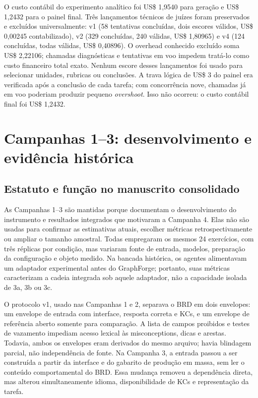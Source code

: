 \documentclass[11pt,a4paper]{article}
\begin{document}
O custo contábil do experimento analítico foi US\$ 1,9540 para geração e US\$ 1,2432 para o painel final. Três lançamentos técnicos de juízes foram preservados e excluídos universalmente: v1 (58 tentativas concluídas, dois escores válidos, US\$ 0,00245 contabilizado), v2 (329 concluídas, 240 válidas, US\$ 1,80965) e v4 (124 concluídas, todas válidas, US\$ 0,40896). O overhead conhecido excluído soma US\$ 2,22106; chamadas diagnósticas e tentativas em voo impedem tratá-lo como custo financeiro total exato. Nenhum escore desses lançamentos foi usado para selecionar unidades, rubricas ou conclusões. A trava lógica de US\$ 3 do painel era verificada após a conclusão de cada tarefa; com concorrência nove, chamadas já em voo poderiam produzir pequeno \emph{overshoot}. Isso não ocorreu: o custo contábil final foi US\$ 1,2432.

\section{Campanhas 1--3: desenvolvimento e evidência histórica}

\subsection{Estatuto e função no manuscrito consolidado}

As Campanhas 1--3 são mantidas porque documentam o desenvolvimento do instrumento e resultados integrados que motivaram a Campanha 4. Elas não são usadas para confirmar as estimativas atuais, escolher métricas retrospectivamente ou ampliar o tamanho amostral. Todas empregaram os mesmos 24 exercícios, com três réplicas por condição, mas variaram fonte de entrada, modelos, preparação da configuração e objeto medido. Na bancada histórica, os agentes alimentavam um adaptador experimental antes do GraphForge; portanto, suas métricas caracterizam a cadeia integrada sob aquele adaptador, não a capacidade isolada de 3a, 3b ou 3c.

O protocolo v1, usado nas Campanhas 1 e 2, separava o BRD em dois envelopes: um envelope de entrada com interface, resposta correta e KCs, e um envelope de referência aberto somente para comparação. A lista de campos proibidos e testes de vazamento impediam acesso lexical às misconceptions, dicas e arestas. Todavia, ambos os envelopes eram derivados do mesmo arquivo; havia blindagem parcial, não independência de fonte. Na Campanha 3, a entrada passou a ser construída a partir da interface e do gabarito de produção em massa, sem ler o conteúdo comportamental do BRD. Essa mudança removeu a dependência direta, mas alterou simultaneamente idioma, disponibilidade de KCs e representação da tarefa.
\end{document}
